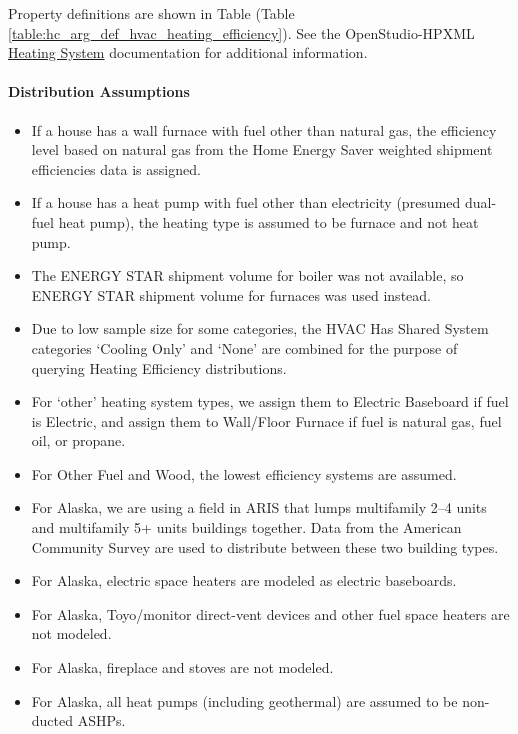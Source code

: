 Property definitions are shown in Table (Table \ref{table:hc_arg_def_hvac_heating_efficiency}). See the OpenStudio-HPXML \href{https://openstudio-hpxml.readthedocs.io/en/v1.10.0/workflow_inputs.html#hpxml-heating-systems}{Heating System} documentation for additional information.



\paragraph{Distribution Assumptions}
% 
\begin{itemize}
    \item If a house has a wall furnace with fuel other than natural gas, the efficiency level based on natural gas from the Home Energy Saver weighted shipment efficiencies data is assigned.
    \item If a house has a heat pump with fuel other than electricity (presumed dual-fuel heat pump), the heating type is assumed to be furnace and not heat pump.
    \item The ENERGY STAR shipment volume for boiler was not available, so ENERGY STAR shipment volume for furnaces was used instead.
    \item Due to low sample size for some categories, the HVAC Has Shared System categories ‘Cooling Only’ and ‘None’ are combined for the purpose of querying Heating Efficiency distributions.
    \item For ‘other’ heating system types, we assign them to Electric Baseboard if fuel is Electric, and assign them to Wall/Floor Furnace if fuel is natural gas, fuel oil, or propane.
    \item For Other Fuel and Wood, the lowest efficiency systems are assumed.
    \item For Alaska, we are using a field in ARIS that lumps multifamily 2--4 units and multifamily 5+ units buildings together. Data from the American Community Survey are used to distribute between these two building types.
    \item For Alaska, electric space heaters are modeled as electric baseboards.
    \item For Alaska, Toyo/monitor direct-vent devices and other fuel space heaters are not modeled.
    \item For Alaska, fireplace and stoves are not modeled.
    \item For Alaska, all heat pumps (including geothermal) are assumed to be non-ducted ASHPs.
\end{itemize}
